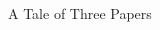 \documentclass[xcolor=table,9pt,aspectratio=169]{beamer}
\begin{document}
\begin{frame}{\vspace*{10mm}A Tale of Three Papers}
\vspace*{-5mm}
\begin{multicols}{3}
\begin{center}

\end{center}
\end{multicols}
\end{frame}
\end{document}
